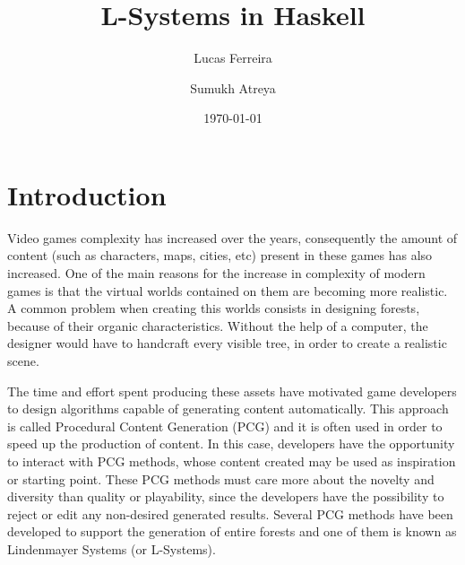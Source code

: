 \documentclass{article}
\title{L-Systems in Haskell}
\author[1]{Lucas Ferreira}
\author[1]{Sumukh Atreya}
\affil[1]{Department of Computer Science}
\affil[1]{University of California, Santa Cruz}
\date{\today}
\begin{document}
\maketitle


\section{Introduction}

Video games complexity has increased over the years, consequently the amount of content
(such as characters, maps, cities, etc) present in these games has also increased.
One of the main reasons for the increase in complexity of modern games is that the
virtual worlds contained on them are becoming more realistic. A common problem
when creating this worlds consists in designing forests, because of their organic
characteristics. Without the help of a computer, the designer would have to handcraft
every visible tree, in order to create a realistic scene.

The time and effort spent producing these assets have motivated game developers to design
algorithms capable of generating content automatically. This approach is called Procedural
Content Generation (PCG) and it is often used in order to speed up the production
of content. In this case, developers have the opportunity to interact with PCG methods,
whose content created may be used as inspiration or starting point. These PCG methods must
care more about the novelty and diversity than quality or playability, since the developers
have the possibility to reject or edit any non-desired generated results. Several PCG
methods have been developed to support the generation of entire forests and one of
them is known as Lindenmayer Systems (or L-Systems).
\end{document}
